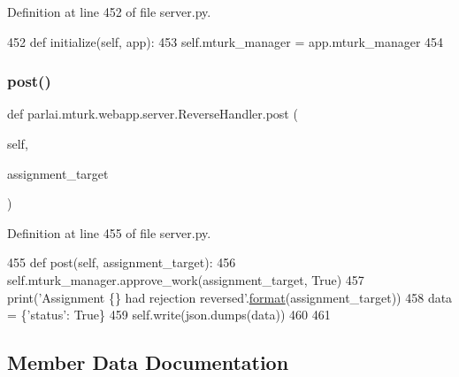 Definition at line 452 of file server.\+py.


\begin{DoxyCode}
452     \textcolor{keyword}{def }initialize(self, app):
453         self.mturk\_manager = app.mturk\_manager
454 
\end{DoxyCode}
\mbox{\label{classparlai_1_1mturk_1_1webapp_1_1server_1_1ReverseHandler_a68457ba85cc4853cd5e1be1cbc05ca22}} 
\subsubsection{\texorpdfstring{post()}{post()}}
{\footnotesize\ttfamily def parlai.\+mturk.\+webapp.\+server.\+Reverse\+Handler.\+post (\begin{DoxyParamCaption}\item[{}]{self,  }\item[{}]{assignment\+\_\+target }\end{DoxyParamCaption})}



Definition at line 455 of file server.\+py.


\begin{DoxyCode}
455     \textcolor{keyword}{def }post(self, assignment\_target):
456         self.mturk\_manager.approve\_work(assignment\_target, \textcolor{keyword}{True})
457         print(\textcolor{stringliteral}{'Assignment \{\} had rejection reversed'}.\hyperlink{namespaceparlai_1_1chat__service_1_1services_1_1messenger_1_1shared__utils_a32e2e2022b824fbaf80c747160b52a76}{format}(assignment\_target))
458         data = \{\textcolor{stringliteral}{'status'}: \textcolor{keyword}{True}\}
459         self.write(json.dumps(data))
460 
461 
\end{DoxyCode}


\subsection{Member Data Documentation}
\mbox{\label{classparlai_1_1mturk_1_1webapp_1_1server_1_1ReverseHandler_a60664e4d71da9169afe68bd7b4f8a801}} 
